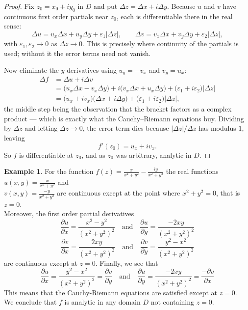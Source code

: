 \documentclass[11pt,a4paper]{article}
\theoremstyle{definition}
\newtheorem{example}[thm]{Example}
\begin{document}
\begin{proof}
Fix $z_0=x_0+iy_0$ in $D$ and put $\Delta z=\Delta x+i\Delta y$. Because $u$
and $v$ have continuous first order partials near $z_0$, each is differentiable
there in the real sense:
$$\Delta u=u_x\Delta x+u_y\Delta y+\varepsilon_1\left|\Delta z\right|,\qquad
\Delta v=v_x\Delta x+v_y\Delta y+\varepsilon_2\left|\Delta z\right|,$$
with $\varepsilon_1,\varepsilon_2\rightarrow 0$ as $\Delta z\rightarrow 0$.
This is precisely where continuity of the partials is used; without it the
error terms need not vanish.

Now eliminate the $y$ derivatives using $u_y=-v_x$ and $v_y=u_x$:
\begin{align*}
\Delta f&=\Delta u+i\Delta v\\
&=\big(u_x\Delta x-v_x\Delta y\big)+i\big(v_x\Delta x+u_x\Delta y\big)
+\big(\varepsilon_1+i\varepsilon_2\big)\left|\Delta z\right|\\
&=\big(u_x+iv_x\big)\big(\Delta x+i\Delta y\big)
+\big(\varepsilon_1+i\varepsilon_2\big)\left|\Delta z\right| ,
\end{align*}
the middle step being the observation that the bracket factors as a complex
product --- which is exactly what the Cauchy--Riemann equations buy. Dividing by
$\Delta z$ and letting $\Delta z\rightarrow 0$, the error term dies because
$\left|\Delta z\right|/\Delta z$ has modulus $1$, leaving
$$f'(z_0)=u_x+iv_x .$$
So $f$ is differentiable at $z_0$, and as $z_0$ was arbitrary, analytic in $D$.
\end{proof}

\begin{example}
For the function $f(z) = \frac{x}{x^2 + y^2} - \frac{iy}{x^2 + y^2}$ the real functions $u(x,y) = \frac{x}{x^2 + y^2}$ and\\ $v(x,y) = \frac{-y}{x^2 + y^2}$ are continuous except at the point where $x^2 + y^2 = 0$, that is $z = 0$.\\
Moreover, the first order partial derivatives
$$\frac{\partial u}{\partial x}= \frac{x^2 - y^2}{(x^2 + y^2)^2}\quad \text{and}\quad  \frac{\partial u}{\partial y} = \frac{-2xy}{(x^2 + y^2)^2}$$
$$\frac{\partial v}{\partial x} = \frac{2xy}{(x^2 + y^2)^2}\quad \text{and}\quad \frac{\partial v}{\partial y} = \frac{y^2 - x^2}{(x^2 + y^2)^2}$$ are continuous except at $z = 0$.
Finally, we see that
$$\frac{\partial u}{\partial x} = \frac{y^2 - x^2}{(x^2 + y^2)^2} = \frac{\partial v}{\partial y}\quad \text{and}\quad  \frac{\partial u}{\partial y} = \frac{-2xy}{(x^2 + y^2)^2}  = \frac{-\partial v}{\partial x}$$
This means that the Cauchy-Riemann equations are satisfied except at $z = 0$.\\
We conclude that $f$ is analytic in any domain $D$ not containing $z = 0$.
\end{example}
\end{document}
